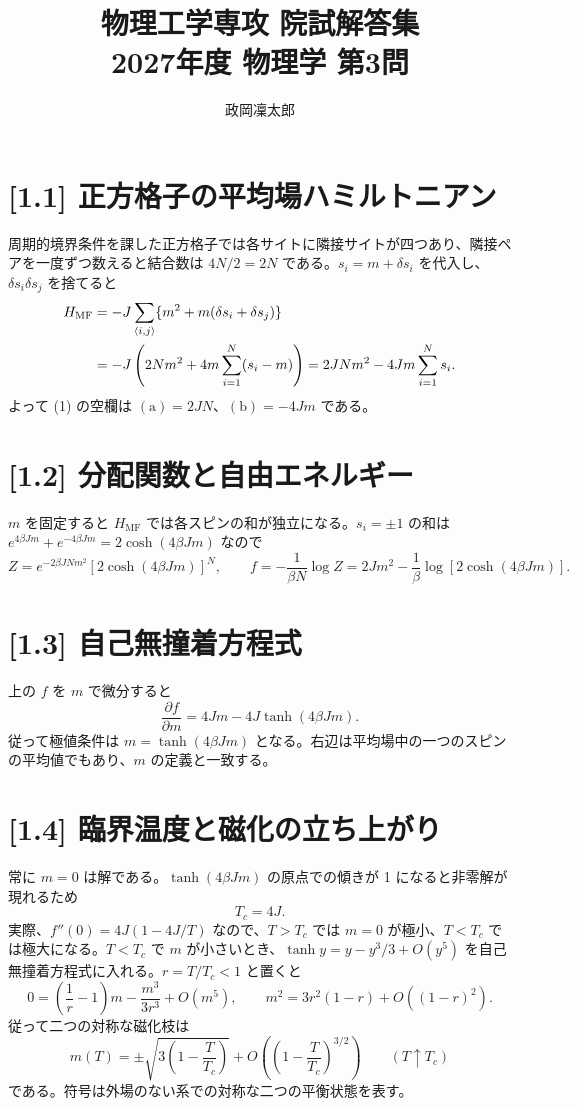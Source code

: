\documentclass[11pt,a4paper]{article}
\title{物理工学専攻 院試解答集\\2027年度 物理学 第3問}
\author{政岡凜太郎}
\date{}
\begin{document}
\maketitle

\section*{[1.1] 正方格子の平均場ハミルトニアン}
周期的境界条件を課した正方格子では各サイトに隣接サイトが四つあり、隣接ペアを一度ずつ数えると結合数は $4N/2=2N$ である。$s_i=m+\delta s_i$ を代入し、$\delta s_i\delta s_j$ を捨てると
\begin{align}
H_{\mathrm{MF}}
&=-J\sum_{\langle i,j\rangle}
\{m^2+m(\delta s_i+\delta s_j)\}\notag\\
&=-J\left(2Nm^2+4m\sum_{i=1}^N(s_i-m)\right)
=2JNm^2-4Jm\sum_{i=1}^N s_i.
\end{align}
よって (1) の空欄は $\boxed{(\mathrm a)=2JN}$、$\boxed{(\mathrm b)=-4Jm}$ である。

\section*{[1.2] 分配関数と自由エネルギー}
$m$ を固定すると $H_{\mathrm{MF}}$ では各スピンの和が独立になる。$s_i=\pm1$ の和は $e^{4\beta Jm}+e^{-4\beta Jm}=2\cosh(4\beta Jm)$ なので
\begin{equation}
\boxed{Z=e^{-2\beta JNm^2}[2\cosh(4\beta Jm)]^N},\qquad
\boxed{f=-\frac{1}{\beta N}\log Z
=2Jm^2-\frac1\beta\log[2\cosh(4\beta Jm)]}.
\end{equation}

\section*{[1.3] 自己無撞着方程式}
上の $f$ を $m$ で微分すると
\begin{equation}
\frac{\partial f}{\partial m}
=4Jm-4J\tanh(4\beta Jm).
\end{equation}
従って極値条件は $\boxed{m=\tanh(4\beta Jm)}$ となる。右辺は平均場中の一つのスピンの平均値でもあり、$m$ の定義と一致する。

\section*{[1.4] 臨界温度と磁化の立ち上がり}
常に $m=0$ は解である。$\tanh(4\beta Jm)$ の原点での傾きが 1 になると非零解が現れるため
\begin{equation}
\boxed{T_c=4J}.
\end{equation}
実際、$f''(0)=4J(1-4J/T)$ なので、$T>T_c$ では $m=0$ が極小、$T<T_c$ では極大になる。$T<T_c$ で $m$ が小さいとき、$\tanh y=y-y^3/3+O(y^5)$ を自己無撞着方程式に入れる。$r=T/T_c<1$ と置くと
\begin{equation}
0=\left(\frac1r-1\right)m-\frac{m^3}{3r^3}+O(m^5),
\qquad m^2=3r^2(1-r)+O((1-r)^2).
\end{equation}
従って二つの対称な磁化枝は
\begin{equation}
\boxed{m(T)=\pm\sqrt{3\left(1-\frac{T}{T_c}\right)}
+O\!\left(\left(1-\frac{T}{T_c}\right)^{3/2}\right)}
\qquad(T\uparrow T_c)
\end{equation}
である。符号は外場のない系での対称な二つの平衡状態を表す。
\end{document}
